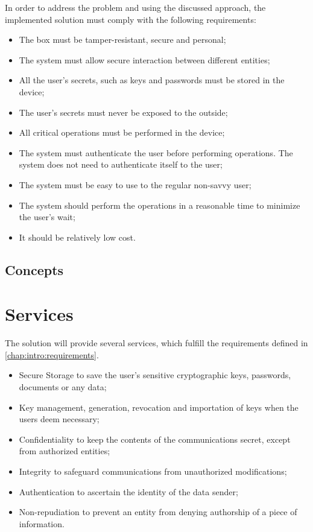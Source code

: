 In order to address the problem and using the discussed approach, the implemented solution must comply with the following requirements:
\begin{itemize}
	\item The box must be tamper-resistant, secure and personal;
	\item The system must allow secure interaction between different entities;
	\item All the user's secrets, such as keys and passwords must be stored in the device;
	\item The user's secrets must never be exposed to the outside;
	\item All critical operations must be performed in the device;
	\item The system must authenticate the user before performing operations. The system does not need to authenticate itself to the user;
	\item The system must be easy to use to the regular non-savvy user;
	\item The system should perform the operations in a reasonable time to minimize the user's wait;
	\item It should be relatively low cost.
\end{itemize}

\subsection{Concepts} \label{chap:problem:concepts}

\section{Services} \label{chap:problem:services}


The solution will provide several services, which fulfill the requirements defined in \ref{chap:intro:requirements}.

\begin{itemize}
    \item Secure Storage to save the user's sensitive cryptographic keys, passwords, documents or any data;
    \item Key management, generation, revocation and importation of keys when the users deem necessary;
    \item Confidentiality to keep the contents of the communications secret, except from authorized entities;
    \item Integrity to safeguard communications from unauthorized modifications;
    \item Authentication to ascertain the identity of the data sender;
    \item Non-repudiation to prevent an entity from denying authorship of a piece of information.
\end{itemize}
